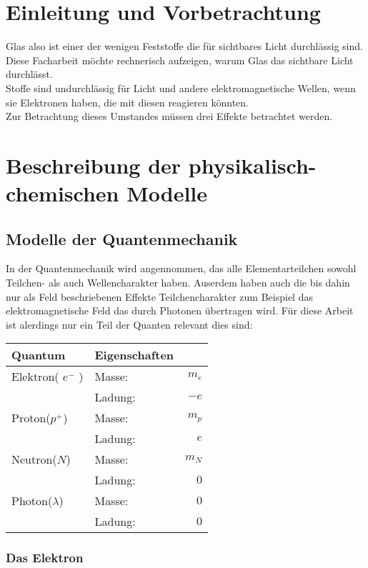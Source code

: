 \documentclass[11pt,a4paper,oneside]{report}
\begin{document}
\renewcommand\contentsname{Inhaltsverzeichnis}
\tableofcontents


\chapter{Einleitung und Vorbetrachtung}

Glas also  ist einer der wenigen Feststoffe die für sichtbares Licht durchlässig sind. Diese Facharbeit möchte rechnerisch aufzeigen, warum Glas das sichtbare Licht durchlässt.
\\Stoffe sind undurchlässig für Licht und andere elektromagnetische Wellen, wenn sie Elektronen haben, die mit diesen reagieren könnten.
\\Zur Betrachtung dieses Umstandes müssen drei Effekte betrachtet werden. \cite{pape99}

\chapter{Beschreibung der physikalisch-chemischen Modelle}

\section{Modelle der Quantenmechanik}
In der Quantenmechanik wird angennommen, das alle Elementarteilchen sowohl Teilchen- als auch Wellencharakter haben. Auserdem haben auch die bis dahin nur als Feld beschriebenen Effekte Teilchencharakter zum Beispiel das elektromagnetische Feld das durch Photonen übertragen wird.
Für diese Arbeit ist alerdings nur ein Teil der Quanten relevant dies sind:

\begin{tabular}{|l|lr|} \hline
Quantum 			& Eigenschaften 	&  		\\  \hline
Elektron( $e^-$ ) 		& Masse: 			& $m_e$	\\
					& Ladung: 		& $-e$ 	\\ \hline
Proton($p^+$) 		& Masse: 			& $m_p$ 	\\
 					& Ladung: 		& $e$ 	\\ \hline 
Neutron($N$)			& Masse:			& $m_N$	\\ 
					& Ladung:		& $0$	\\ \hline
Photon($ \lambda $) 	& Masse: 			& $0$	\\ 
					&Ladung:			& $0$	\\ \hline
\end{tabular}
\subsection{Das Elektron}
\end{document}
